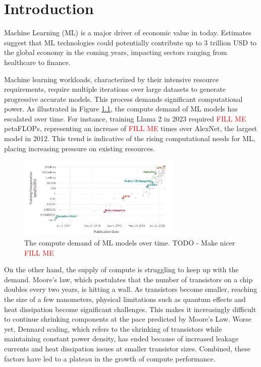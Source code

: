 \chapter{Introduction}
\label{ch_intro}

\newcommand{\fillme}{\textcolor{red}{FILL ME}}

Machine Learning (ML) is a major driver of economic value in today. Estimates suggest that ML technologies could potentially contribute up to 3 trillion USD \cite{something} to the global economy in the coming years, impacting sectors ranging from healthcare to finance. 

Machine learning workloads, characterized by their intensive resource requirements, require multiple iterations over large datasets to generate progressive accurate models. This process demands significant computational power. As illustrated in Figure \ref{fig:compute_demand}, the compute demand of ML models has escalated over time. For instance, training Llama 2 in 2023 required \fillme{} petaFLOPs, representing an increase of \fillme{} times over AlexNet, the largest model in 2012. This trend is indicative of the rising computational needs for ML, placing increasing pressure on existing resources.

\begin{figure}
    \centering
    \includegraphics[width=0.7\textwidth]{intro/figures/MLCompute.png}
    \caption{The compute demand of ML models over time. TODO - Make nicer \fillme{}}
    \label{fig:compute_demand}
\end{figure}

On the other hand, the supply of compute is struggling to keep up with the demand. Moore's law, which postulates that the number of transistors on a chip doubles every two years, is hitting a wall. As transistors become smaller, reaching the size of a few nanometers, physical limitations such as quantum effects and heat dissipation become significant challenges. This makes it increasingly difficult to continue shrinking components at the pace predicted by Moore's Law. Worse yet, Dennard scaling, which refers to the shrinking of transistors while maintaining constant power density, has ended because of increased leakage currents and heat dissipation issues at smaller transistor sizes. Combined, these factors have led to a plateau in the growth of compute performance.


